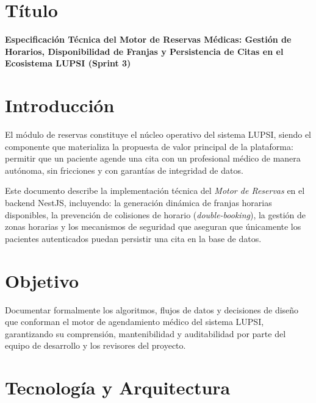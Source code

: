 \documentclass[a4paper,12pt]{article}
\begin{document}
    \raggedbottom

    \section{Título}
    \textbf{Especificación Técnica del Motor de Reservas Médicas: Gestión de Horarios, Disponibilidad de Franjas y Persistencia de Citas en el Ecosistema LUPSI (Sprint 3)}

    \section{Introducción}
    El módulo de reservas constituye el núcleo operativo del sistema LUPSI, siendo el componente que materializa la propuesta de valor principal de la plataforma: permitir que un paciente agende una cita con un profesional médico de manera autónoma, sin fricciones y con garantías de integridad de datos.

    Este documento describe la implementación técnica del \textit{Motor de Reservas} en el backend NestJS, incluyendo: la generación dinámica de franjas horarias disponibles, la prevención de colisiones de horario (\textit{double-booking}), la gestión de zonas horarias y los mecanismos de seguridad que aseguran que únicamente los pacientes autenticados puedan persistir una cita en la base de datos.

    \section{Objetivo}
    Documentar formalmente los algoritmos, flujos de datos y decisiones de diseño que conforman el motor de agendamiento médico del sistema LUPSI, garantizando su comprensión, mantenibilidad y auditabilidad por parte del equipo de desarrollo y los revisores del proyecto.

    \section{Tecnología y Arquitectura}
\end{document}
